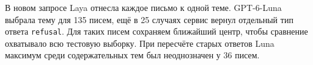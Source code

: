 В новом запросе Laya отнесла каждое письмо к одной теме. GPT-6-Luna выбрала тему для 135 писем, ещё в 25 случаях сервис вернул отдельный тип ответа \texttt{refusal}. Для таких писем сохраняем ближайший центр, чтобы сравнение охватывало всю тестовую выборку. При пересчёте старых ответов Luna максимум среди содержательных тем был неоднозначен у 36 писем.
